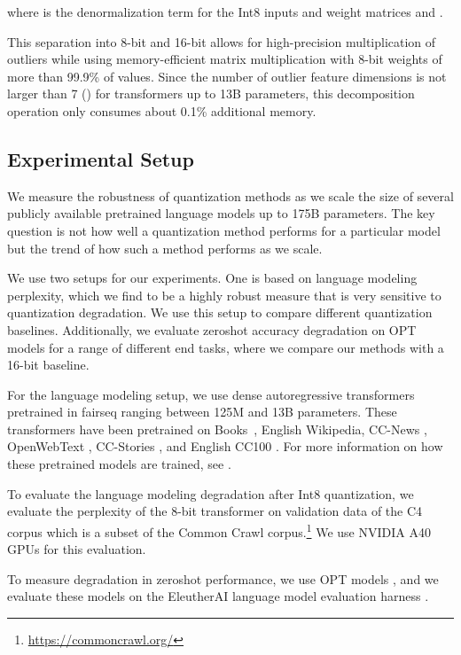 \documentclass{article}
\begin{document}
where  is the denormalization term for the Int8 inputs and weight matrices  and .

This separation into 8-bit and 16-bit allows for high-precision multiplication of outliers while using memory-efficient matrix multiplication with 8-bit weights of more than 99.9\% of values. Since the number of outlier feature dimensions is not larger than 7 () for transformers up to 13B parameters, this decomposition operation only consumes about 0.1\% additional memory.

\subsection{Experimental Setup}

We measure the robustness of quantization methods as we scale the size of several publicly available pretrained language models up to 175B parameters. The key question is not how well a quantization method performs for a particular model but the trend of how such a method performs as we scale.

We use two setups for our experiments. One is based on language modeling perplexity, which we find to be a highly robust measure that is very sensitive to quantization degradation. We use this setup to compare different quantization baselines. Additionally, we evaluate zeroshot accuracy degradation on OPT models for a range of different end tasks, where we compare our methods with a 16-bit baseline.

For the language modeling setup, we use dense autoregressive transformers pretrained in fairseq \citep{ott2019fairseq} ranging between 125M and 13B parameters. These transformers have been pretrained on Books~\citep{zhu2015aligning}, English Wikipedia, CC-News \citep{nagel2016cc}, OpenWebText \citep{gokaslan2019openwebtext}, CC-Stories \citep{trinh2018simple}, and English CC100 \citep{wenzek-etal-2020-ccnet}. For more information on how these pretrained models are trained, see \citet{artetxe2021efficient}.
 
To evaluate the language modeling degradation after Int8 quantization, we evaluate the perplexity of the 8-bit transformer on validation data of the C4 corpus \citep{raffel2019exploring} which is a subset of the Common Crawl corpus.\footnote{\url{https://commoncrawl.org/}} We use NVIDIA A40 GPUs for this evaluation.

To measure degradation in zeroshot performance, we use OPT models \citep{zhang2022opt}, and we evaluate these models on the EleutherAI language model evaluation harness \citep{eval-harness}.
\end{document}
